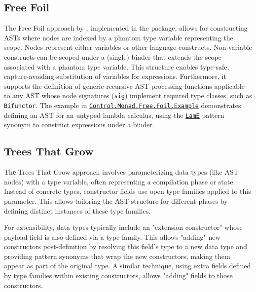 \subsection{Free Foil}
\label{chap:LiteratureReview:sec:AstRepresentations:FreeFoil}

The Free Foil approach \cite{kudasov-free-2024} by \citeauthor{kudasov-free-2024}, implemented in the \cite{free-foil-hackage} package, allows for constructing ASTs where nodes are indexed by a phantom type variable representing the scope. Nodes represent either variables or other language constructs. Non-variable constructs can be scoped under a (single) binder that extends the scope associated with a phantom type variable. This structure enables type-safe, capture-avoiding substitution of variables for expressions. Furthermore, it supports the definition of generic recursive AST processing functions applicable to any AST whose node signatures (\texttt{sig}) implement required type classes, such as \texttt{Bifunctor}. The example in \href{https://hackage.haskell.org/package/free-foil-0.2.0/docs/Control-Monad-Free-Foil-Example.html}{\texttt{Control.Monad.Free.Foil.Example}} demonstrates defining an AST for an untyped lambda calculus, using the \href{https://hackage.haskell.org/package/free-foil-0.2.0/docs/src/Control.Monad.Free.Foil.Example.html#LamE}{\texttt{LamE}} pattern synonym to construct expressions under a binder.

\subsection{Trees That Grow}
\label{chap:LiteratureReview:sec:AstRepresentations:TreesThatGrow}

Thе Trees That Grow approach involves parameterizing data types (like AST nodes) with a type variable, often representing a compilation phase or state. Instead of concrete types, constructor fields use open type families applied to this parameter. This allows tailoring the AST structure for different phases by defining distinct instances of these type families.

For extensibility, data types typically include an "extension constructor" whose payload field is also defined via a type family. This allows "adding" new constructors post-definition by resolving this field's type to a new data type and providing pattern synonyms that wrap the new constructors, making them appear as part of the original type. A similar technique, using extra fields defined by type families within existing constructors, allows "adding" fields to those constructors.

